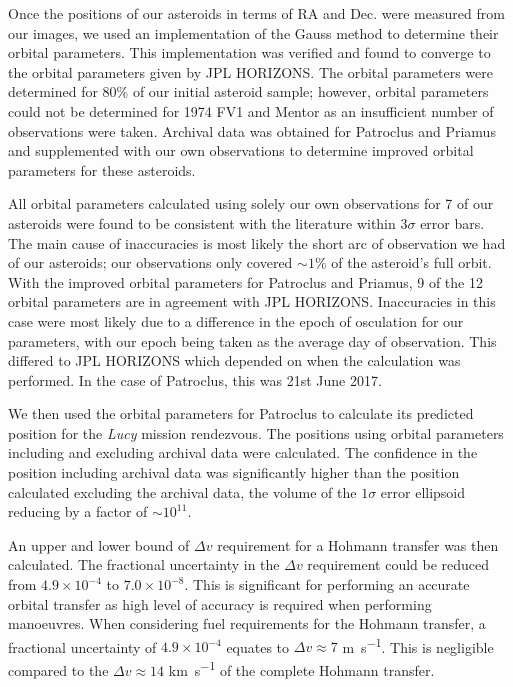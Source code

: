\documentclass[10pt, twocolumn]{revtex4}    %
\newcommand{\Lucy}{\textit{Lucy }}
\begin{document}
Once the positions of our asteroids in terms of RA and Dec. were measured from our images, we used an implementation of the Gauss method to determine their orbital parameters. This implementation was verified and found to converge to the orbital parameters given by JPL HORIZONS. The orbital parameters were determined for $80\%$ of our initial asteroid sample; however, orbital parameters could not be determined for 1974 FV1 and Mentor as an insufficient number of observations were taken. Archival data was obtained for Patroclus and Priamus and supplemented with our own observations to determine improved orbital parameters for these asteroids.

All orbital parameters calculated using solely our own observations for 7 of our asteroids were found to be consistent with the literature within $3\sigma$ error bars. The main cause of inaccuracies is most likely the short arc of observation we had of our asteroids; our observations only covered ${\sim}1\%$ of the asteroid's full orbit. With the improved orbital parameters for Patroclus and Priamus, 9 of the 12 orbital parameters are in agreement with JPL HORIZONS. Inaccuracies in this case were most likely due to a difference in the epoch of osculation for our parameters, with our epoch being taken as the average day of observation. This differed to JPL HORIZONS which depended on when the calculation was performed. In the case of Patroclus, this was 21st June 2017.

We then used the orbital parameters for Patroclus to calculate its predicted position for the \Lucy mission rendezvous. The positions using orbital parameters including and excluding archival data were calculated. The confidence in the position including archival data was significantly higher than the position calculated excluding the archival data, the volume of the $1\sigma$ error ellipsoid reducing by a factor of ${\sim}10^{11}$.

An upper and lower bound of $\Delta v$ requirement for a Hohmann transfer was then calculated. The fractional uncertainty in the $\Delta v$ requirement could be reduced from $4.9 \times 10^{-4}$ to $7.0 \times 10^{-8}$. This is significant for performing an accurate orbital transfer as high level of accuracy is required when performing manoeuvres. When considering fuel requirements for the Hohmann transfer, a fractional uncertainty of $4.9 \times 10^{-4}$ equates to $\Delta v \approx 7$ \si{\metre\per\second}. This is negligible compared to the $\Delta v \approx 14$ \si{\kilo\metre\per\second} of the complete Hohmann transfer.
 
\end{document}
